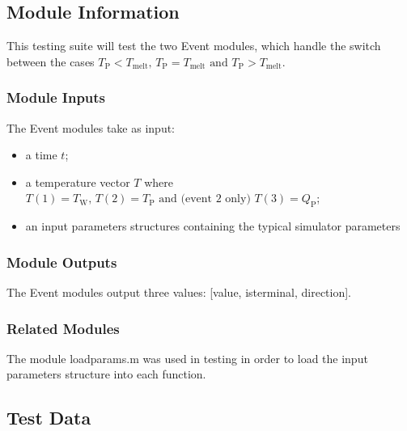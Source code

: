 \documentclass[12pt]{article}
\begin{document}
\subsection{Module Information}
This testing suite will test the two Event modules, which handle the switch 
between the cases $T_{\text{P}} < T_{\text{melt}} \text{, } T_{\text{P}} = T_{\text{melt}}
\text{ and } T_{\text{P}} > T_{\text{melt}}$.

\subsubsection{Module Inputs}
The Event modules take as input:
\begin{itemize}
\item a time $t$;
\item a temperature vector $T$ where $T(1) = T_{\text{W}} \text{, } 
T(2) = T_{\text{P}} \text{ and (event 2 only) } T(3) = Q_{\text{P}}$;
\item an input parameters structures containing the typical simulator parameters
\end{itemize}

\subsubsection{Module Outputs}
The Event modules output three values: [value, isterminal, direction]. 

\subsubsection{Related Modules}
The module loadparams.m was used in testing in order to load the input parameters 
structure into each function.

\subsection{Test Data}
\end{document}
